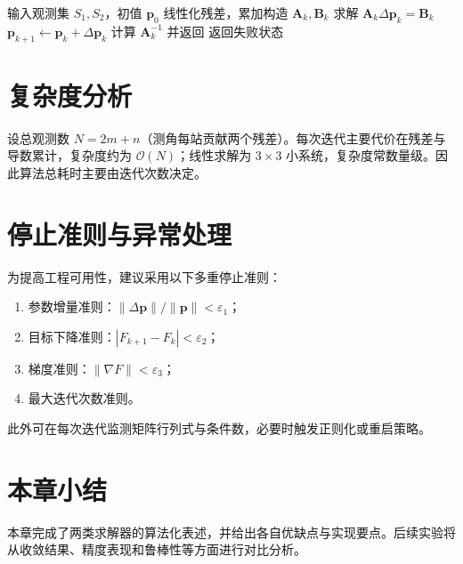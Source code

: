 \begin{algorithm}[H]
\caption{法方程迭代定位}
\begin{algorithmic}[1]
\State 输入观测集 $S_1,S_2$，初值 $\bm p_0$
\State 线性化残差，累加构造 $\bm A_k,\bm B_k$
\State 求解 $\bm A_k\Delta\bm p_k=\bm B_k$
\State $\bm p_{k+1}\gets \bm p_k+\Delta\bm p_k$
\State 计算 $\bm A_k^{-1}$ 并返回
\EndIf
\EndFor
\State 返回失败状态
\end{algorithmic}
\end{algorithm}

\section{复杂度分析}
设总观测数 $N=2m+n$（测角每站贡献两个残差）。每次迭代主要代价在残差与导数累计，复杂度约为 $\mathcal O(N)$；线性求解为 $3\times3$ 小系统，复杂度常数量级。因此算法总耗时主要由迭代次数决定。

\section{停止准则与异常处理}
为提高工程可用性，建议采用以下多重停止准则：
\begin{enumerate}
  \item 参数增量准则：$\|\Delta\bm p\|/\|\bm p\|<\varepsilon_1$；
  \item 目标下降准则：$|F_{k+1}-F_k|<\varepsilon_2$；
  \item 梯度准则：$\|\nabla F\|<\varepsilon_3$；
  \item 最大迭代次数准则。
\end{enumerate}
此外可在每次迭代监测矩阵行列式与条件数，必要时触发正则化或重启策略。

\section{本章小结}
本章完成了两类求解器的算法化表述，并给出各自优缺点与实现要点。后续实验将从收敛结果、精度表现和鲁棒性等方面进行对比分析。
